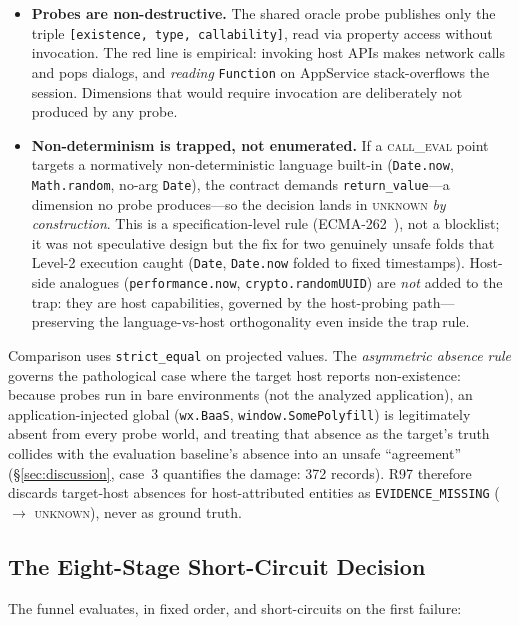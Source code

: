 \documentclass[sigconf,nonacm]{acmart}
\begin{document}
\begin{itemize}
  \item \textbf{Probes are non-destructive.} The shared oracle probe publishes only the triple \texttt{[existence, type, callability]}, read via property access without invocation. The red line is empirical: invoking host APIs makes network calls and pops dialogs, and \emph{reading} \texttt{Function} on AppService stack-overflows the session. Dimensions that would require invocation are deliberately not produced by any probe.
  \item \textbf{Non-determinism is trapped, not enumerated.} If a \textsc{call\_eval} point targets a normatively non-deterministic language built-in (\texttt{Date.now}, \texttt{Math.random}, no-arg \texttt{Date}), the contract demands \texttt{return\_value}---a dimension no probe produces---so the decision lands in \textsc{unknown} \emph{by construction}. This is a specification-level rule (ECMA-262~\cite{ecma262}), not a blocklist; it was not speculative design but the fix for two genuinely unsafe folds that Level-2 execution caught (\texttt{Date}, \texttt{Date.now} folded to fixed timestamps). Host-side analogues (\texttt{performance.now}, \texttt{crypto.randomUUID}) are \emph{not} added to the trap: they are host capabilities, governed by the host-probing path---preserving the language-vs-host orthogonality even inside the trap rule.
\end{itemize}

Comparison uses \texttt{strict\_equal} on projected values. The \emph{asymmetric absence rule} governs the pathological case where the target host reports non-existence: because probes run in bare environments (not the analyzed application), an application-injected global (\texttt{wx.BaaS}, \texttt{window.SomePolyfill}) is legitimately absent from every probe world, and treating that absence as the target's truth collides with the evaluation baseline's absence into an unsafe ``agreement'' (\S\ref{sec:discussion}, case~3 quantifies the damage: 372 records). R97 therefore discards target-host absences for host-attributed entities as \texttt{EVIDENCE\_MISSING} ($\to$ \textsc{unknown}), never as ground truth.

\subsection{The Eight-Stage Short-Circuit Decision}\label{sec:funnel}

The funnel evaluates, in fixed order, and short-circuits on the first failure:
\end{document}
